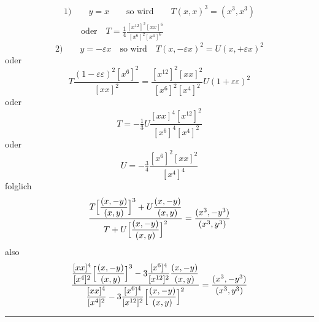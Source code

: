 \[
\begin{gathered}1)\qquad y=x\qquad\text{so wird}\qquad
T(x,x)^3=(x^3,x^3)\\[8pt]\quad{}\quad\text{oder}\quad
T=\tfrac14\frac{[x^{12}]^2[xx]^6}{[x^6]^2[x^4]^6}\end{gathered}
\]
\[
2)\qquad y=-\varepsilon x\quad\text{so wird}\quad
T(x,-\varepsilon x)^2=U(x,+\varepsilon x)^2
\]
oder
\[
T\frac{(1-\varepsilon\varepsilon)^2[x^6]^2}{[xx]^2}
=\frac{[x^{12}]^2[xx]^2}{[x^6]^2[x^4]^2}U(1+\varepsilon\varepsilon)^2
\]
oder
\[
T=-\tfrac13 U\frac{[xx]^4[x^{12}]^2}{[x^6]^4[x^4]^2}
\]
oder
\[
U=-\tfrac34\frac{[x^6]^2[xx]^2}{[x^4]^4}
\]
folglich
\[
\begin{gathered}\frac{T\Bigl[\dfrac{(x,-y)}{(x,y)}\Bigr]^3
+U\dfrac{(x,-y)}{(x,y)}}
{T+U\Bigl[\dfrac{(x,-y)}{(x,y)}\Bigr]^2}
=\frac{(x^3,-y^3)}{(x^3,y^3)}\end{gathered}
\]
also
\[
\begin{gathered}\frac{\dfrac{[xx]^4}{[x^4]^2}
\Bigl[\dfrac{(x,-y)}{(x,y)}\Bigr]^3
-3\dfrac{[x^6]^4}{[x^{12}]^2}\dfrac{(x,-y)}{(x,y)}}
{\dfrac{[xx]^4}{[x^4]^2}
-3\dfrac{[x^6]^4}{[x^{12}]^2}
\Bigl[\dfrac{(x,-y)}{(x,y)}\Bigr]^2}
=\frac{(x^3,-y^3)}{(x^3,y^3)}\end{gathered}
\]
\begin{center}\rule{.23\textwidth}{.3pt}\end{center}


